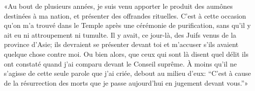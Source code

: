 «Au bout de plusieurs années,
	je suis venu apporter le produit des aumônes destinées à ma nation,
	et présenter des offrandes rituelles.
C’est à cette occasion qu’on m’a trouvé dans le Temple
	après une cérémonie de purification,
	sans qu’il y ait eu ni attroupement ni tumulte.
Il y avait, ce jour-là, des Juifs venus de la province d’Asie;
	ils devraient se présenter devant toi et m’accuser
	s’ils avaient quelque chose contre moi.
Ou bien alors, que ceux qui sont là disent quel délit ils ont constaté
	quand j’ai comparu devant le Conseil suprême.
À moins qu’il ne s’agisse de cette seule parole que j’ai criée, debout au milieu d’eux:
	“C’est à cause de la résurrection des morts
	que je passe aujourd’hui en jugement devant vous.”»
